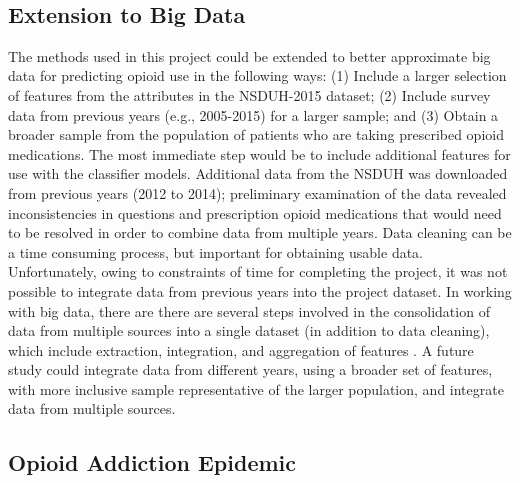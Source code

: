 \\\documentclass[sigconf]{acmart}
\begin{document}
\subsection{Extension to Big Data}

The methods used in this project could be extended to better approximate big 
data for predicting opioid use in the following ways: (1) Include a larger 
selection of features from the attributes in the NSDUH-2015 dataset; (2) 
Include survey data from previous years (e.g., 2005-2015) for a larger sample;  
and (3) Obtain a broader sample from the population of patients who are 
taking prescribed opioid medications. The most immediate step would be to 
include additional features for use with the classifier models. Additional 
data from the NSDUH was downloaded from previous years (2012 to 2014); 
preliminary examination of the data revealed inconsistencies in questions 
and prescription opioid medications that would need to be resolved in order 
to combine data from multiple years. Data cleaning can be a time consuming 
process, but important for obtaining usable data. Unfortunately, owing to 
constraints of time for completing the project, it was not possible to
integrate data from previous years into the project dataset. In working with
big data, there are there are several steps involved in the consolidation of 
data from multiple sources into a single dataset (in addition to data 
cleaning), which include extraction, integration, and aggregation of features  
\cite{rahm00}. A future study could integrate data from different years, 
using a broader set of features, with more inclusive sample representative
of the larger population, and integrate data from multiple sources. 

\subsection{Opioid Addiction Epidemic}
\end{document}
